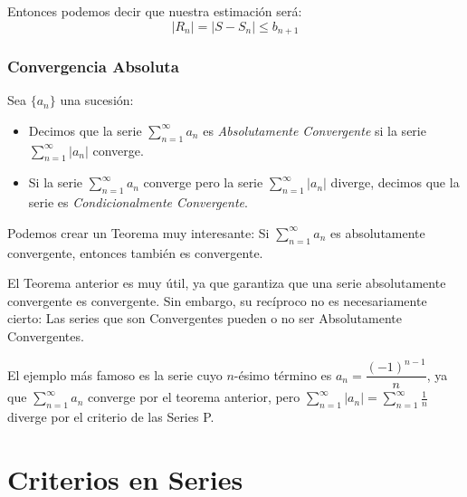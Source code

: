 \documentclass[12pt]{report}                                %
\begin{document}
        Entonces podemos decir que nuestra estimación será:
        \begin{equation}
            |R_n| = |S - S_n| \leq b_{n+1}
        \end{equation}

    \subsection{Convergencia Absoluta}

        Sea $\{a_n\}$ una sucesión:

        \begin{itemize}
            \item Decimos que la serie $\sum_{n=1}^{\infty} a_n$ es \emph{Absolutamente Convergente} si la serie $\sum_{n=1}^{\infty} |a_n|$ converge.

            \item Si la serie $\sum_{n=1}^{\infty} a_n$ converge pero la serie $\sum_{n=1}^{\infty} |a_n|$ diverge, decimos que la serie es \emph{Condicionalmente Convergente}.
        \end{itemize}

        Podemos crear un Teorema muy interesante:
        Si $\sum_{n=1}^{\infty} a_n$ es absolutamente convergente, entonces también es convergente.

        El Teorema anterior es muy útil, ya que garantiza que una serie absolutamente convergente es convergente.
        Sin embargo, su recíproco no es necesariamente cierto: Las series que son Convergentes pueden o no ser Absolutamente Convergentes. 

        El ejemplo más famoso es la serie cuyo $n$-ésimo término es $a_n=\dfrac{(-1)^{n-1}}{n}$, ya que $\sum_{n=1}^{\infty}a_n$ converge por el teorema anterior, pero $\sum_{n=1}^{\infty} |a_n| = \sum_{n=1}^{\infty} \frac{1}{n}$ diverge por el criterio de las Series P.







\clearpage
\chapter{Criterios en Series}
\end{document}

